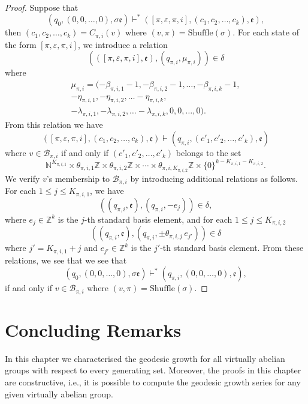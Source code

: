 \begin{proof}
Suppose that
\[
	(q_0,(0,0,\ldots,0),\sigma\mathfrak{e})
	\vdash^*
	([\pi,\varepsilon,\pi,i],(c_1,c_2,\ldots,c_k),\mathfrak{e}),
\]
then $(c_1,c_2,\ldots,c_k) = C_{\pi,i}(v)$ where $(v,\pi) = \mathrm{Shuffle}(\sigma)$.
For each state of the form $[\pi,\varepsilon,\pi,i]$, we introduce a relation
\[
	(([\pi,\varepsilon,\pi,i],\mathfrak{e}),(q_{\pi,i},\mu_{\pi,i})) \in \delta
\]
where
\begin{multline*}
	\mu_{\pi,i}
	=
	(
		-\beta_{\pi,i,1}-1,
		-\beta_{\pi,i,2}-1,
		\ldots,
		-\beta_{\pi,i,k}-1,
	\\
		-\eta_{\pi,i,1},
		-\eta_{\pi,i,2},
		\ldots
		-\eta_{\pi,i,k},
	\\
		-\lambda_{\pi,i,1},
		-\lambda_{\pi,i,2},
		\ldots
		-\lambda_{\pi,i,k},
		0,0,\ldots,0
	).
\end{multline*}
From this relation we have
\[
	([\pi,\varepsilon,\pi,i],(c_1,c_2,\ldots,c_k),\mathfrak{e})
	\vdash
	(q_{\pi,i},(c'_1,c'_2,\ldots,c'_k),\mathfrak{e})
\]
where $v \in \mathcal{B}_{\pi,i}$ if and only if $(c'_1,c'_2,\ldots,c'_k)$ belongs to the set
\[
	\mathbb{N}^{K_{\pi,i,1}} \times 
	\theta_{\pi,i,1}\mathbb{Z}
	\times \theta_{\pi,i,2}\mathbb{Z}
	\times \cdots
	\times \theta_{\pi,i,K_{\pi,i,2}}\mathbb{Z}
	\times \{0\}^{k-K_{\pi,i,1}-K_{\pi,i,2}}.
\]
We verify $v$'s membership to $\mathcal{B}_{\pi,i}$ by introducing additional relations as follows.
For each $1 \leqslant j \leqslant K_{\pi,i,1}$, we have
\[
	((q_{\pi,i},\mathfrak{e}),(q_{\pi,i},-e_j)) \in \delta,
\]
where $e_j \in \mathbb{Z}^k$ is the $j$-th standard basis element, and for each $ 1 \leqslant j \leqslant  K_{\pi,i,2}$
\[
	((q_{\pi,i},\mathfrak{e}),(q_{\pi,i},\pm\theta_{\pi,i,j} \, e_{j'})) \in \delta
\]
where $j' = K_{\pi,i,1}+j$ and $e_{j'} \in \mathbb{Z}^k$ is the $j'$-th standard basis element.
From these relations, we see that we see that
\[
	(q_0,(0,0,\ldots,0),\sigma\mathfrak{e})
	\vdash^*
	(q_{\pi,i},(0,0,\ldots,0),\mathfrak{e}),
\]
if and only if $v \in \mathcal{B}_{\pi,i}$ where $(v,\pi) = \mathrm{Shuffle}(\sigma)$.
\end{proof}

\section{Concluding Remarks}\label{sec:virt-abel/concluding}

In this chapter we characterised the geodesic growth for all virtually abelian groups with respect to every generating set.
Moreover, the proofs in this chapter are constructive, i.e., it is possible to compute the geodesic growth series for any given virtually abelian group.

